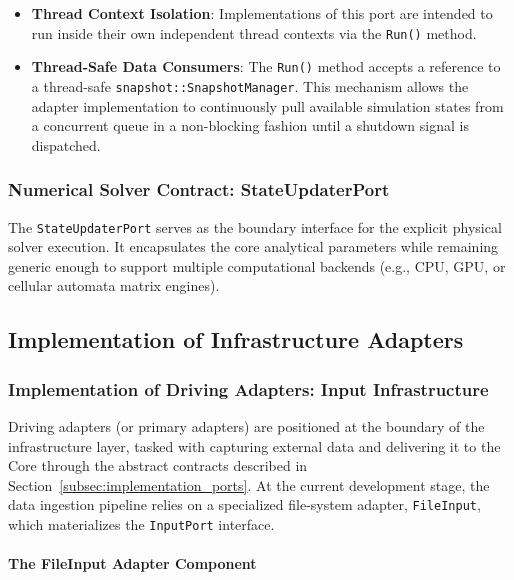 \begin{itemize}
    \item \textbf{Thread Context Isolation}: Implementations of this port are intended to run inside 
    their own independent thread contexts via the \texttt{Run()} method.
    
    \item \textbf{Thread-Safe Data Consumers}: The \texttt{Run()} method accepts a reference to a thread-safe 
    \texttt{snapshot::SnapshotManager}. This mechanism allows the adapter implementation to continuously pull available simulation 
    states from a concurrent queue in a non-blocking fashion until a shutdown signal is dispatched.
\end{itemize}

\subsubsection{Numerical Solver Contract: StateUpdaterPort}

The \texttt{StateUpdaterPort} serves as the boundary interface for the explicit physical solver execution. It encapsulates the core 
analytical parameters while remaining generic enough to support multiple computational backends (e.g., CPU, GPU, or cellular automata 
matrix engines).


\subsection{Implementation of Infrastructure Adapters}

\subsubsection{Implementation of Driving Adapters: Input Infrastructure}

Driving adapters (or primary adapters) are positioned at the boundary of the infrastructure layer, tasked with capturing external 
data and delivering it to the Core through the abstract contracts described in Section~\ref{subsec:implementation_ports}. At the 
current development stage, the data ingestion pipeline relies on a specialized file-system adapter, \texttt{FileInput}, which 
materializes the \texttt{InputPort} interface.

\paragraph{The FileInput Adapter Component}

